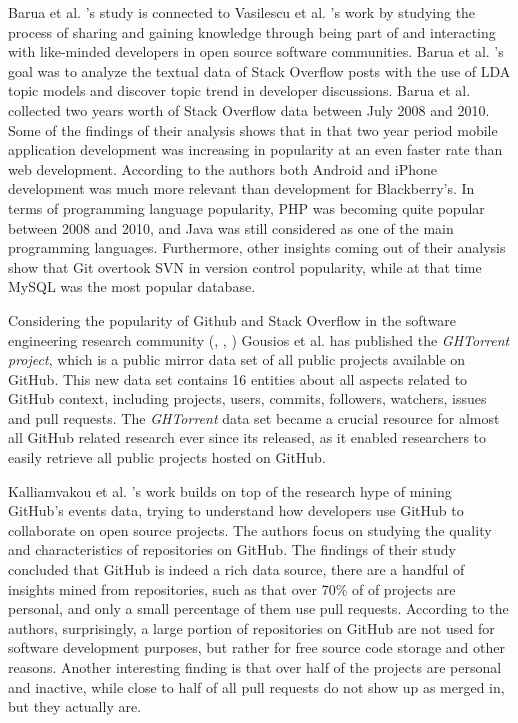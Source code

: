         Barua et al. \cite{barua2014developers}'s study is connected to Vasilescu et al. \cite{vasilescu2014social}'s work by studying the process of sharing and gaining knowledge through being part of and interacting with like-minded developers in open source software communities. Barua et al. \cite{barua2014developers}'s goal was to analyze the textual data of Stack Overflow posts with the use of LDA topic models and discover topic trend in developer discussions. Barua et al. collected two years worth of Stack Overflow data between July 2008 and 2010. Some of the findings of their analysis shows that in that two year period mobile application development was increasing in popularity at an even faster rate than web development. According to the authors both Android and iPhone development was much more relevant than development for Blackberry's. In terms of programming language popularity, PHP was becoming quite popular between 2008 and 2010, and  Java was still considered as one of the main programming languages. Furthermore, other insights coming out of their analysis show that Git overtook SVN in version control popularity, while at that time MySQL was the most popular database.
        
        Considering the popularity of Github and Stack Overflow in the software engineering research community (\cite{vasilescu2013stackoverflow}, \cite{badashian2014involvement}, \cite{lee2017github}) Gousios et al. \cite{gousios2013ghtorent} has published the \emph{GHTorrent project}, which is a public mirror data set of all public projects available on GitHub. This new data set contains 16 entities about all aspects related to GitHub context, including projects, users, commits, followers, watchers, issues and pull requests. The \emph{GHTorrent} data set became a crucial resource for almost all GitHub related research ever since its released, as it enabled researchers to easily retrieve all public projects hosted on GitHub. 
        
        Kalliamvakou et al. \cite{kalliamvakou2014promises}'s work builds on top of the research hype of mining GitHub's events data, trying to understand how developers use GitHub to collaborate on open source projects. The authors focus on studying the quality and characteristics of repositories on GitHub. The findings of their study concluded that GitHub is indeed a rich data source, there are a handful of insights mined from repositories, such as that over 70\% of of projects are personal, and only a small percentage of them use pull requests. According to the authors, surprisingly, a large portion of repositories on GitHub are not used for software development purposes, but rather for free source code storage and other reasons. Another interesting finding is that over half of the projects are personal and inactive, while close to half of all pull requests do not show up as merged in, but they actually are.
        
